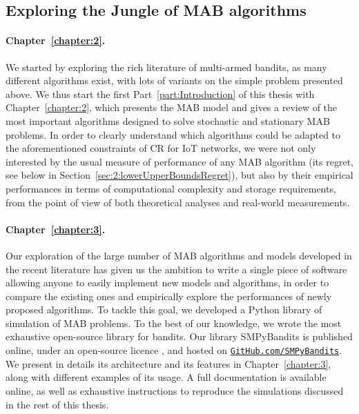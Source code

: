 \subsection{Exploring the Jungle of MAB algorithms}

\paragraph{Chapter~\ref{chapter:2}.}
%
We started by exploring the rich literature of multi-armed bandits,
as many different algorithms exist, with lots of variants on the simple problem presented above.
We thus start the first Part~\ref{part:Introduction} of this thesis with Chapter~\ref{chapter:2}, which presents the MAB model and gives a review of the most important algorithms designed to solve stochastic and stationary MAB problems.
%
In order to clearly understand which algorithms could be adapted to the aforementioned constraints of CR for IoT networks,
we were not only interested by the usual measure of performance of any MAB algorithm (its regret, see below in Section~\ref{sec:2:lowerUpperBoundsRegret}),
but also by their empirical performances in terms of computational complexity and storage requirements, from the point of view of both theoretical analyses and real-world measurements.


\paragraph{Chapter~\ref{chapter:3}.}
%
Our exploration of the large number of MAB algorithms and models developed in the recent literature
has given us the ambition to write a single piece of software allowing anyone to easily implement new models and algorithms, in order to compare the existing ones and empirically explore the performances of newly proposed algorithms.
To tackle this goal, we developed a Python library of simulation of MAB problems.
%
To the best of our knowledge, we wrote the most exhaustive open-source library for bandits. Our library SMPyBandits is published online, under an open-source licence \cite{SMPyBanditsJMLR,SMPyBandits}, and hosted on \href{https://GitHub.com/SMPyBandits}{\texttt{GitHub.com/SMPyBandits}}.
We present in details its architecture and its features in Chapter~\ref{chapter:3}, along with different examples of its usage.
A full documentation is available online, as well as exhaustive instructions to reproduce the simulations discussed in the rest of this thesis.


